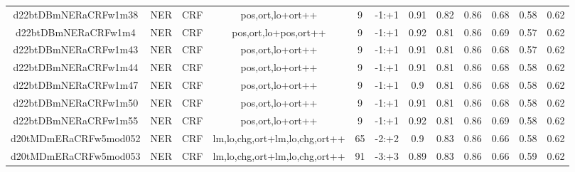\documentclass[a4paper]{article}
\begin{document}
\begin{landscape}
\begin{center}
\begin{tabular}{ |c|c|c|c|c|c|c|c|c|c|c|c|}
 
 	
 	\small{ d22btDBmNERaCRFw1m38 } & \small{ NER} & \small{  CRF }  & pos,ort,lo+ort++  &  9 &  \small{  -1:+1 }  &  0.91 & 0.82 & 0.86  &  0.68 & 0.58 & 0.62 \\
 	

 
 	
 	\small{ d22btDBmNERaCRFw1m4 } & \small{ NER} & \small{  CRF }  & pos,ort,lo+pos,ort++  &  9 &  \small{  -1:+1 }  &  0.92 & 0.81 & 0.86  &  0.69 & 0.57 & 0.62 \\
 	

 
 	
 	\small{ d22btDBmNERaCRFw1m43 } & \small{ NER} & \small{  CRF }  & pos,ort,lo+ort++  &  9 &  \small{  -1:+1 }  &  0.91 & 0.81 & 0.86  &  0.68 & 0.57 & 0.62 \\
 	

 
 	
 	\small{ d22btDBmNERaCRFw1m44 } & \small{ NER} & \small{  CRF }  & pos,ort,lo+ort++  &  9 &  \small{  -1:+1 }  &  0.91 & 0.81 & 0.86  &  0.68 & 0.58 & 0.62 \\
 	

 
 	
 	\small{ d22btDBmNERaCRFw1m47 } & \small{ NER} & \small{  CRF }  & pos,ort,lo+ort++  &  9 &  \small{  -1:+1 }  &  0.9 & 0.81 & 0.86  &  0.68 & 0.58 & 0.62 \\
 	

 
 	
 	\small{ d22btDBmNERaCRFw1m50 } & \small{ NER} & \small{  CRF }  & pos,ort,lo+ort++  &  9 &  \small{  -1:+1 }  &  0.91 & 0.81 & 0.86  &  0.68 & 0.58 & 0.62 \\
 	

 
 	
 	\small{ d22btDBmNERaCRFw1m55 } & \small{ NER} & \small{  CRF }  & pos,ort,lo+ort++  &  9 &  \small{  -1:+1 }  &  0.92 & 0.81 & 0.86  &  0.69 & 0.58 & 0.62 \\
 	

 
 	
 	\small{ d20tMDmERaCRFw5mod052 } & \small{ NER} & \small{  CRF }  & lm,lo,chg,ort+lm,lo,chg,ort++  &  65 &  \small{  -2:+2 }  &  0.9 & 0.83 & 0.86  &  0.66 & 0.58 & 0.62 \\
 	

 
 	
 	\small{ d20tMDmERaCRFw5mod053 } & \small{ NER} & \small{  CRF }  & lm,lo,chg,ort+lm,lo,chg,ort++  &  91 &  \small{  -3:+3 }  &  0.89 & 0.83 & 0.86  &  0.66 & 0.59 & 0.62 \\
 	


\end{tabular}
\end{center}
\end{landscape}
\end{document}
